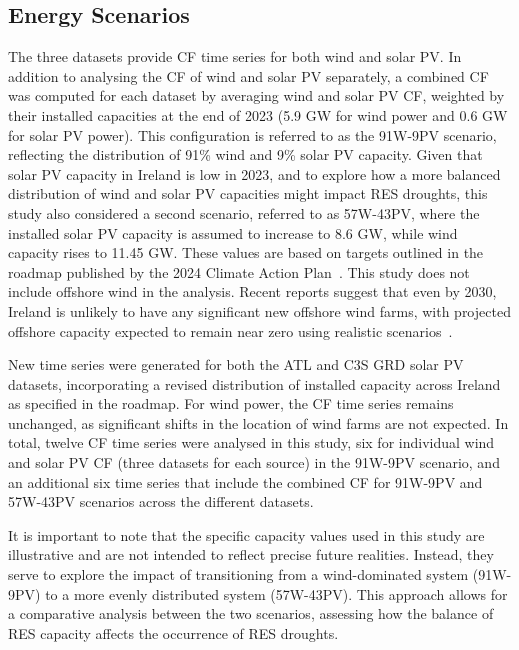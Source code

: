 \documentclass[preprint, 12pt]{elsarticle}
\begin{document}
\subsection{Energy Scenarios}
\label{sec:scenarios}

The three datasets provide CF time series for both wind and solar PV. In addition to analysing the CF of wind and solar PV separately, a combined CF was computed for each dataset by averaging wind and solar PV CF, weighted by their installed capacities at the end of 2023 (5.9 GW for wind power and 0.6 GW for solar PV power). This configuration is referred to as the 91W-9PV scenario, reflecting the distribution of 91\% wind and 9\% solar PV capacity. Given that solar PV capacity in Ireland is low in 2023, and to explore how a more balanced distribution of wind and solar PV capacities might impact RES droughts, this study also considered a second scenario, referred to as 57W-43PV, where the installed solar PV capacity is assumed to increase to 8.6 GW, while wind capacity rises to 11.45 GW. These values are based on targets outlined in the roadmap published by the 2024 Climate Action Plan~\citep{cap2024future}. This study does not include offshore wind in the analysis. Recent reports suggest that even by 2030, Ireland is unlikely to have any significant new offshore wind farms, with projected offshore capacity expected to remain near zero using realistic scenarios~\citep{seai2024future}.

New time series were generated for both the ATL and C3S GRD solar PV datasets, incorporating a revised distribution of installed capacity across Ireland as specified in the roadmap. For wind power, the CF time series remains unchanged, as significant shifts in the location of wind farms are not expected. In total, twelve CF time series were analysed in this study, six for individual wind and solar PV CF (three datasets for each source) in the 91W-9PV scenario, and an additional six time series that include the combined CF for 91W-9PV and 57W-43PV scenarios across the different datasets.

It is important to note that the specific capacity values used in this study are illustrative and are not intended to reflect precise future realities. Instead, they serve to explore the impact of transitioning from a wind-dominated system (91W-9PV) to a more evenly distributed system (57W-43PV). This approach allows for a comparative analysis between the two scenarios, assessing how the balance of RES capacity affects the occurrence of RES droughts.
\end{document}
